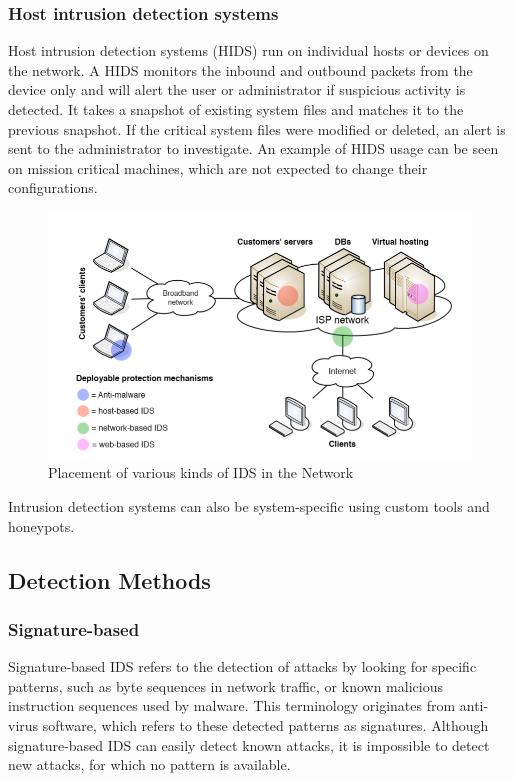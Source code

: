 \documentclass[12pt]{article}
\theoremstyle{definition}
\begin{document}
			\subsubsection{Host intrusion detection systems}
			Host intrusion detection systems (HIDS) run on individual hosts or devices on the network. A HIDS monitors the inbound and outbound packets from the device only and will alert the user or administrator if suspicious activity is detected. It takes a snapshot of existing system files and matches it to the previous snapshot. If the critical system files were modified or deleted, an alert is sent to the administrator to investigate. An example of HIDS usage can be seen on mission critical machines, which are not expected to change their configurations.
			\begin{figure}
				\centering
				\includegraphics[width=400pt]{pictures/applications-of-ids.png}
				\caption{Placement of various kinds of IDS in the Network}
				\label{fig:mlp-net}
			\end{figure}
			Intrusion detection systems can also be system-specific using custom tools and honeypots.	
			
		\subsection{Detection Methods}
			\subsubsection{Signature-based}
			Signature-based IDS refers to the detection of attacks by looking for specific patterns, such as byte sequences in network traffic, or known malicious instruction sequences used by malware. This terminology originates from anti-virus software, which refers to these detected patterns as signatures. Although signature-based IDS can easily detect known attacks, it is impossible to detect new attacks, for which no pattern is available.
\end{document}
